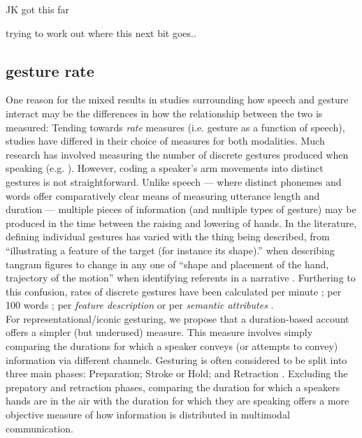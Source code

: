 \documentclass[a4paper,man,natbib]{apa6}
\newcommand*{\term}[1]{\emph{#1}} %
\begin{document}
\noindent\makebox[\linewidth]{\rule{\paperwidth}{0.4pt}}
JK got this far

\newpage
trying to work out where this next bit goes..
\subsection{gesture rate}
One reason for the mixed results in studies surrounding how speech and gesture interact may be the differences in how the relationship between the two is measured:
Tending towards \term{rate} measures (i.e. gesture as a function of speech), studies have differed in their choice of measures for both modalities.
Much research has involved measuring the number of discrete gestures produced when speaking (e.g. \citet{Hostetter2007, Gerwing2011, DeRuiter2012, Hoetjes2015}).
However, coding a speaker's arm movements into distinct gestures is not straightforward.
Unlike speech --- where distinct phonemes and words offer comparatively clear means of measuring utterance length and duration --- multiple pieces of information (and multiple types of gesture) may be produced in the time between the raising and lowering of hands.
In the literature, defining individual gestures has varied with the thing being described, from ``illustrating a feature of the target (for instance its shape).'' when describing tangram figures \citep{DeRuiter2012} to change in any one of ``shape and placement of the hand, trajectory of the motion'' when identifying referents in a narrative \citep{So2009}.
Furthering to this confusion, rates of discrete gestures have been calculated per minute \citep{Mol2011}; per 100 words \citep{Masson-Carro2015, Hostetter2007, Gerwing2011, Hoetjes2015}; per \term{feature description} \citep{DeRuiter2012} or per \term{semantic attributes} \citep{Hoetjes2015}.\\

For representational/iconic gesturing, we propose that a duration-based account offers a simpler (but underused) measure.
This measure involves simply comparing the durations for which a speaker conveys (or attempts to convey) information via different channels. 
Gesturing is often considered to be split into three main phases: Preparation; Stroke or Hold; and Retraction \citep{McNeill1992}.
Excluding the prepatory and retraction phases, comparing the duration for which a speakers hands are in the air with the duration for which they are speaking offers a more objective measure of how 
information is distributed in multimodal communication.
\end{document}
